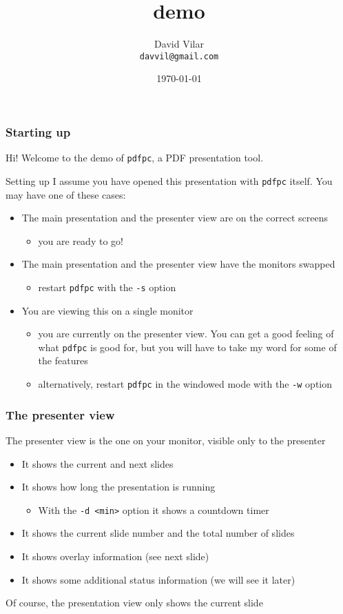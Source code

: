 \documentclass{beamer}
\title{\pdfpc demo}
\author[D. Vilar]{David Vilar \\ \texttt{davvil@gmail.com}}
\date{\today}
\institute{}
\newcommand{\singleitem}[1]{\begin{itemize}\item #1\end{itemize}}
\newcommand{\pdfpc}{\texttt{pdfpc}\xspace}
\newcommand{\opt}[1]{\texttt{#1}\xspace}
\begin{document}
\begin{frame}
  \titlepage
  \hypertarget{titlePage}{}
\end{frame}

\begin{frame}
  \frametitle{Starting up}
  Hi! Welcome to the demo of \pdfpc, a PDF presentation tool.
  \begin{block}{Setting up}
    I assume you have opened this presentation with \pdfpc itself. You may have
    one of these cases:
    \begin{itemize}
      \item The main presentation and the presenter view are on the correct
        screens
          \singleitem{you are ready to go!}
      \item The main presentation and the presenter view have the monitors
        swapped
          \singleitem{restart \pdfpc with the \opt{-s} option}
      \item You are viewing this on a single monitor
        \begin{itemize}
          \item you are currently on the presenter view. You can get a
            good feeling of what \pdfpc is good for, but you will have to take
            my word for some of the features
          \item alternatively, restart \pdfpc in the windowed mode with the
            \opt{-w} option
        \end{itemize}
    \end{itemize}
  \end{block}
\end{frame}

\begin{frame}
  \frametitle{The presenter view}
  The presenter view is the one on your monitor, visible only to the presenter
  \begin{itemize}
    \item It shows the current and next slides
    \item It shows how long the presentation is running
      \singleitem{With the \opt{-d <min>} option it shows a countdown timer}
    \item It shows the current slide number and the total number of slides
    \item It shows overlay information (see next slide)
    \item It shows some additional status information (we will see it later)
  \end{itemize}
  Of course, the presentation view only shows the current slide
\end{frame}
\end{document}
